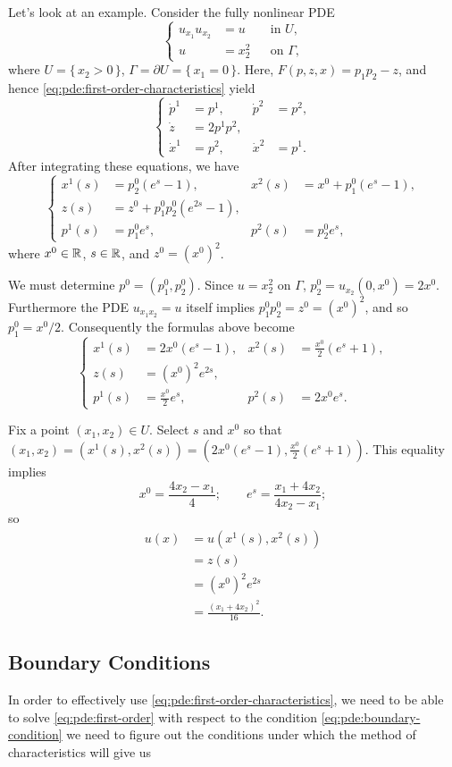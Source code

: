 \begin{example}
  Let's look at an example. Consider the fully nonlinear PDE
  \[
    \tag{\(*\)}
    \left\{
      \begin{aligned}
        u_{x_1}u_{x_2}&=u&&\text{in \(U\),}\\
        u&=x_2^2&&\text{on \(\Gamma\),}
      \end{aligned}
    \right.
  \]
  where \(U=\{\,x_2>0\,\}\), \(\Gamma=\partial U=\{\,x_1=0\,\}\). Here,
  \(F(p,z,x)=p_1p_2-z\), and hence
  \eqref{eq:pde:first-order-characteristics} yield
  \[
    \left\{
      \begin{aligned}
        \dot p^1&=p^1,&\dot p^2&=p^2,\\
        \dot z&=2p^1p^2,\\
        \dot x^1&=p^2,&\dot x^2&=p^1.
      \end{aligned}
    \right.
  \]
After integrating these equations, we have
\[
  \left\{
    \begin{aligned}
      x^1(s)&=p_2^0(e^s-1),&x^2(s)&=x^0+p_1^0(e^s-1),\\
      z(s)&=z^0+p_1^0p_2^0(e^{2s}-1),\\
      p^1(s)&=p_1^0e^s,&p^2(s)&=p_2^0e^s,
    \end{aligned}
  \right.
\]
where \(x^0\in\mathbb{R}\), \(s\in\mathbb{R}\), and \(z^0={(x^0)}^2\).

We must determine \(p^0=(p_1^0,p_2^0)\). Since \(u=x_2^2\) on \(\Gamma\),
\(p_2^0=u_{x_2}(0,x^0)=2x^0\). Furthermore the PDE \(u_{x_1x_2}=u\) itself
implies \(p_1^0p_2^0=z^0={(x^0)}^2\), and so \(p_1^0=x^0/2\). Consequently
the formulas above become
\[
  \left\{
    \begin{aligned}
      x^1(s)&=2x^0(e^s-1),&x^2(s)&=\frac{x^0}{2}(e^s+1),\\
      z(s)&={(x^0)}^{2}e^{2s},\\
      p^1(s)&=\frac{x^0}{2}e^s,&p^2(s)&=2x^0e^s.
    \end{aligned}
  \right.
\]

Fix a point \((x_1,x_2)\in U\). Select \(s\) and \(x^0\) so that
\((x_1,x_2)=(x^1(s),x^2(s))=(2x^0(e^s-1),\frac{x^0}{2}(e^s+1))\). This
equality implies
\[
  x^0=\frac{4x_2-x_1}{4};\qquad e^s=\frac{x_1+4x_2}{4x_2-x_1};
\]
so
\begin{align*}
  u(x)
  &=u(x^1(s),x^2(s))\\
  &=z(s)\\
  &={(x^0)}^2e^{2s}\\
  &=\frac{(x_1+4x_2)^2}{16}.
\end{align*}
\end{example}

\subsection{Boundary Conditions}
In order to effectively use \eqref{eq:pde:first-order-characteristics}, we
need to be able to solve \eqref{eq:pde:first-order} with respect to the
condition \eqref{eq:pde:boundary-condition} we need to figure out the
conditions under which the method of characteristics will give us

